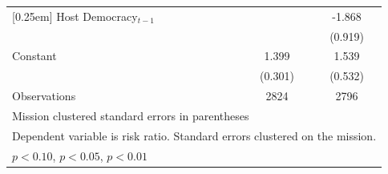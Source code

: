 \documentclass{beamer}
\begin{document}
\begin{frame}[fragile]
\begin{table}[htbp]
\begin{tabular}{l*{2}{c}}
[0.25em]
Host Democracy$_{t-1}$      &                    &      -1.868\sym{*} \\
                    &                    &     (0.919)        \\
[0.25em]
Constant            &       1.399\sym{**}&       1.539\sym{**}\\
                    &     (0.301)        &     (0.532)        \\
\hline
Observations        &        2824        &        2796        \\
\hline\hline
\multicolumn{3}{l}{\fontsize{5}{6}\selectfont Mission clustered standard errors in parentheses}\\
\multicolumn{3}{l}{\fontsize{5}{6}\selectfont Dependent variable is risk ratio. Standard errors clustered on the mission.}\\
\multicolumn{3}{l}{\fontsize{5}{6}\selectfont \sym{\dagger} \(p<0.10\), \sym{*} \(p<0.05\), \sym{**} \(p<0.01\)}\\
\end{tabular}
\end{table}

\end{frame}

\end{document}
